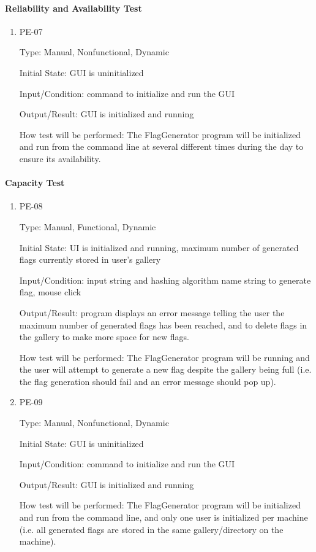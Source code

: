 \documentclass[12pt, titlepage]{article}
\begin{document}
\paragraph{Reliability and Availability Test}

\begin{enumerate}

\item{PE-07\\}

Type: Manual, Nonfunctional, Dynamic

Initial State: GUI is uninitialized

Input/Condition: command to initialize and run the GUI

Output/Result: GUI is initialized and running

How test will be performed: The FlagGenerator program will be initialized and
run from the command line at several different times during the day to ensure
its availability.

\end{enumerate}

\paragraph{Capacity Test}

\begin{enumerate}

\item{PE-08\\}

Type: Manual, Functional, Dynamic

Initial State: UI is initialized and running, maximum number of generated
flags currently stored in user's gallery

Input/Condition: input string and hashing algorithm name string to generate
flag, mouse click

Output/Result: program displays an error message telling the user the maximum
number of generated flags has been reached, and to delete flags in the gallery
to make more space for new flags.

How test will be performed: The FlagGenerator program will be running and the
user will attempt to generate a new flag despite the gallery being full (i.e.
the flag generation should fail and an error message should pop up).

\item{PE-09\\}

Type: Manual, Nonfunctional, Dynamic

Initial State: GUI is uninitialized

Input/Condition: command to initialize and run the GUI

Output/Result: GUI is initialized and running

How test will be performed: The FlagGenerator program will be initialized and
run from the command line, and only one user is initialized per machine (i.e.
all generated flags are stored in the same gallery/directory on the machine).

\end{enumerate}
\end{document}
